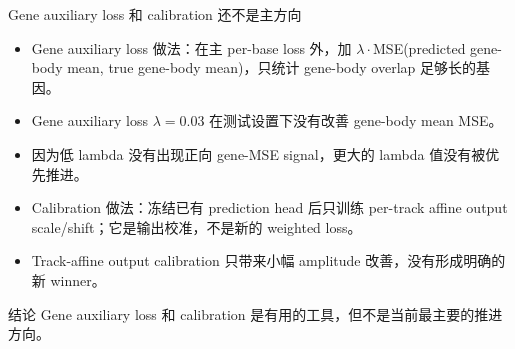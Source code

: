 \documentclass[UTF8,aspectratio=169,10pt]{ctexbeamer}
\begin{document}
\begin{frame}{Gene auxiliary loss 和 calibration 还不是主方向}
  \begin{itemize}
    \item Gene auxiliary loss 做法：在主 per-base loss 外，加 $\lambda\cdot$MSE(predicted gene-body mean, true gene-body mean)，只统计 gene-body overlap 足够长的基因。
    \item Gene auxiliary loss $\lambda=0.03$ 在测试设置下没有改善 gene-body mean MSE。
    \item 因为低 lambda 没有出现正向 gene-MSE signal，更大的 lambda 值没有被优先推进。
    \item Calibration 做法：冻结已有 prediction head 后只训练 per-track affine output scale/shift；它是输出校准，不是新的 weighted loss。
    \item Track-affine output calibration 只带来小幅 amplitude 改善，没有形成明确的新 winner。
  \end{itemize}

  \vspace{0.8em}
  \begin{block}{结论}
    Gene auxiliary loss 和 calibration 是有用的工具，但不是当前最主要的推进方向。
  \end{block}
\end{frame}
\end{document}
